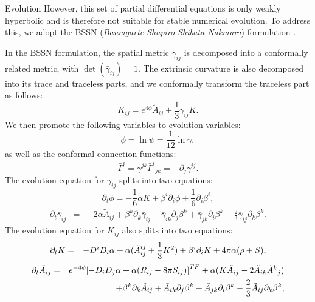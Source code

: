 \documentclass[noamssymb]{beamer}
\newlength{\colwidth}
\begin{document}
\begin{frame}[t]
\begin{columns}[t]
\begin{column}{\colwidth}
\begin{block}{Evolution}
  	However, this set of partial differential equations is only weakly hyperbolic and is therefore not suitable for stable numerical evolution. To address this, we adopt the BSSN (\textit{Baumgarte-Shapiro-Shibata-Nakmura}) formulation \cite{Nakamura:1987,  Shibata:1995we, Baumgarte:1998te}.
  	
  	In the BSSN formulation, the spatial metric $\gamma_{ij}$ is decomposed into a conformally related metric, with $\det (\bar{\gamma}_{ij}) = 1$. The extrinsic curvature is also decomposed into its trace and traceless parts, and we conformally transform the traceless part as follows:
  	\begin{equation}
  		K_{ij} = e^{4\phi}\tilde{A}_{ij} + \frac{1}{3}\gamma_{ij}K.
  	\end{equation}
  	We then promote the following variables to evolution variables:
  	\begin{equation}
  		\phi = \ln \psi = \frac{1}{12}\ln \gamma,
  	\end{equation}
  	as well as the conformal connection functions:
  	\begin{equation}
  		\bar{\Gamma}^i = \bar{\gamma}^{jk}\bar{\Gamma}^i{}_{jk} = -\partial_j \bar{\gamma}^{ij}.
  	\end{equation}
  	The evolution equation for $\gamma_{ij}$ splits into two equations:
  	\begin{equation}
  		\partial_t \phi = - \frac{1}{6}\alpha K + \beta^i \partial_i \phi + \frac{1}{6}\partial_i \beta^i,
  	\end{equation}
  	\begin{eqnarray}
  		\label{eq:bssn_gamma}
  		\partial_t \bar{\gamma}_{ij} &=& -2\alpha \tilde{A}_{ij} + \beta^k \partial_k \bar{\gamma}_{ij}  +\bar{\gamma}_{ik}\partial_j \beta^k + \bar{\gamma}_{jk}\partial_i \beta^k - \frac{2}{3}\bar{\gamma}_{ij}\partial_k\beta^k.
  	\end{eqnarray}
  	The evolution equation for $K_{ij}$ also splits into two equations:
  	\begin{eqnarray}
  		\label{eq:bssn_K}
  		\partial_t K &=& -D^iD_i \alpha + \alpha (\tilde{A}_{ij}\title{A}^{ij} + \frac{1}{3}K^2)+\beta^i\partial_i K + 4\pi \alpha (\rho + S),
  	\end{eqnarray}
  	\begin{eqnarray}
  		\label{eq:bssn_A}
  		\partial_t \tilde{A}_{ij} &=& e^{-4\phi}\qty[-D_iD_j\alpha + \alpha(R_{ij} - 8\pi S_{ij})]^{TF} + \alpha(K\tilde{A}_{ij} - 2\tilde{A}_{ik}\tilde{A}^k{}_{j})\nonumber\\&& + \beta^k\partial_k \tilde{A}_{ij} + \tilde{A}_{ik}\partial_j\beta^k + \tilde{A}_{jk}\partial_i\beta^k - \frac{2}{3}\tilde{A}_{ij}\partial_k\beta^k,

\end{eqnarray}
\end{block}
\end{column}
\end{columns}
\end{frame}
\end{document}
